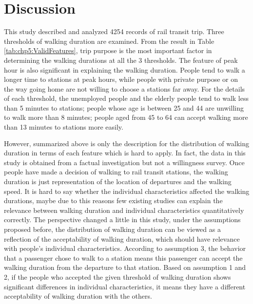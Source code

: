 %
\section{Discussion}
This study described and analyzed 4254 records of rail transit trip. Three thresholds of walking duration are examined. From the result in Table \ref{tab:chp5:ValidFeatures}, trip purpose is the most important factor in determining the walking durations at all the 3 thresholds. The feature of peak hour is also significant in explaining the walking duration. People tend to walk a longer time to stations at peak hours, while people with private purpose or on the way going home are not willing to choose a stations far away. For the details of each threshold, the unemployed people and the elderly people tend to walk less than 5 minutes to stations; people whose age is between 25 and 44 are unwilling to walk more than 8 minutes; people aged from 45 to 64 can accept walking more than 13 minutes to stations more easily.

%
However, summarized above is only the description for the distribution of walking duration in terms of each feature which is hard to apply. In fact, the data in this study is obtained from a factual investigation but not a willingness survey. Once people have made a decision of walking to rail transit stations, the walking duration is just representation of the location of departures and the walking speed. It is hard to say whether the individual characteristics affected the walking durations, maybe due to this reasons few existing studies can explain the relevance between walking duration and individual characteristics quantitatively correctly. The perspective changed a little in this study, under the assumptions proposed before, the distribution of walking duration can be viewed as a reflection of the acceptability of walking duration, which should have relevance with people's individual characteristics. According to assumption 3, the behavior that a passenger chose to walk to a station means this passenger can accept the walking duration from the departure to that station. Based on assumption 1 and 2, if the people who accepted the given threshold of walking duration shows significant differences in individual characteristics, it means they have a different acceptability of walking duration with the others.

